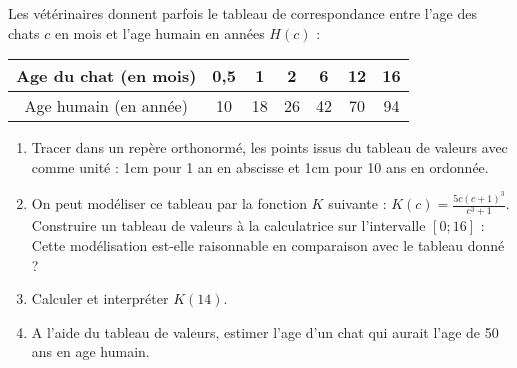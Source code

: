 
Les vétérinaires donnent parfois le tableau de correspondance entre l'age des chats $c$ en mois et l'age humain en années $H(c)$ : 

\begin{tabular}{|c|c|c|c|c|c|c|}
\hline 
Age du chat (en mois) & 0,5 & 1 & 2 & 6 & 12 & 16 \\ 
\hline 
Age humain (en année) & 10 & 18 & 26 & 42 & 70 & 94 \\ 
\hline 
\end{tabular} 


\begin{enumerate}
\item Tracer dans un repère orthonormé, les points issus du tableau de valeurs avec comme unité : 1cm pour 1 an en abscisse et 1cm pour 10 ans en ordonnée.
\item On peut modéliser ce tableau par la fonction $K$ suivante : $K(c)=\frac{5c(c+1)^3}{c^3+1}$. Construire un tableau de valeurs à la calculatrice sur l'intervalle $[0;16]$ : Cette modélisation est-elle raisonnable en comparaison avec le tableau donné ?
\item Calculer et interpréter $K(14)$.
\item A l'aide du tableau de valeurs, estimer l'age d'un chat qui aurait l'age de 50 ans en age humain.
\end{enumerate}

 